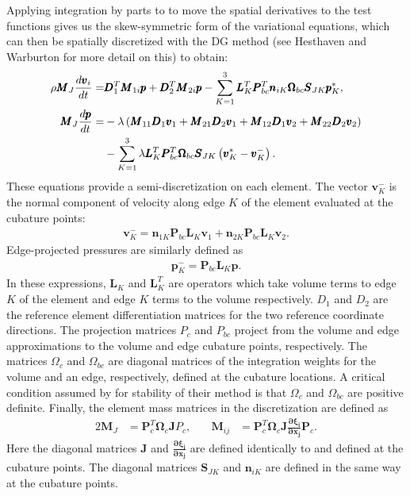 Applying integration by parts to  to move the spatial derivatives to
the test functions gives us the skew-symmetric form of the variational equations, which
can then be spatially discretized with the DG method (see Hesthaven and Warburton for more
detail on this) to obtain:
\begin{align}
  \rho \pmb{M}_{J} \frac{d \pmb{v}_{i}}{dt} =&
  \pmb{D}_{1}^{T} \pmb{M}_{1i} \pmb{p}
  + \pmb{D}_{2}^{T} \pmb{M}_{2i} \pmb{p}
  - \sum_{K=1}^{3} \pmb{L}_{K}^{T} \pmb{P}_{bc}^{T} \pmb{n}_{iK}
  \pmb{\Omega}_{bc} \pmb{S}_{JK} \pmb{p}_{K}^{*},\\
  \notag
  \pmb{M}_{J} \frac{d\pmb{p}}{dt} =&
  -\lambda\left(
  \pmb{M}_{11} \pmb{D}_{1} \pmb{v}_{1}
    +
    \pmb{M}_{21} \pmb{D}_{2} \pmb{v}_{1}
    +
    \pmb{M}_{12} \pmb{D}_{1} \pmb{v}_{2}
    +
    \pmb{M}_{22} \pmb{D}_{2} \pmb{v}_{2}
  \right)\\
  &- \sum_{K=1}^{3}\lambda \pmb{L}_{K}^{T} \pmb{P}_{bc}^{T} \pmb{\Omega}_{bc}
  \pmb{S}_{JK} \left(\pmb{v}_{K}^* - \pmb{v}_{K}^{-}\right).
\end{align}
These equations provide a semi-discretization on each element.
The vector $\pmb{v}_{K}^{-}$ is the normal component of velocity along
edge $K$ of the element evaluated at the cubature points:
\begin{align}
  \pmb{v}^{-}_{K} = \pmb{n}_{1K} \pmb{P}_{bc} \pmb{L}_{K} \pmb{v}_{1}
  + \pmb{n}_{2K} \pmb{P}_{bc} \pmb{L}_{K} \pmb{v}_{2}.
\end{align}
Edge-projected pressures are similarly defined as
\begin{align}
  \pmb{p}_{K}^{-} = \pmb{P}_{bc}\pmb{L}_{K} \pmb{p}.
\end{align}
In these expressions, $\pmb{L}_{K}$ and $\pmb{L}_{K}^{T}$ are operators
which take volume terms to edge $K$ of the element and edge $K$ terms to
the volume respectively. $D_{1}$ and $D_{2}$ are the reference
element differentiation matrices for the two reference coordinate directions.
The projection matrices $P_{c}$ and $P_{bc}$ project from the volume and edge
approximations to the volume and edge cubature points, respectively. The matrices
$\Omega_{c}$ and $\Omega_{bc}$ are diagonal matrices of the integration weights for
the volume and an edge, respectively, defined at the cubature locations. A critical
condition assumed by \cite{kozdon2016stable} for stability of their method is that
$\Omega_{c}$ and $\Omega_{bc}$ are positive definite. Finally, the
element mass matrices in the discretization are defined as
\begin{alignat}{2}
  \pmb{M}_{J}  &= \pmb{P}_{c}^{T} \pmb{\Omega}_{c} \pmb{J} P_{c},\quad&
  \pmb{M}_{ij} &= \pmb{P}_{c}^{T} \pmb{\Omega}_{c} \pmb{J}
		  \frac{\pmb{\partial \xi_{i}}}{\pmb{\partial x_{j}}} \pmb{P}_{c}.
\end{alignat}
Here the diagonal matrices $\pmb{J}$ and $\pmb{\frac{\partial \xi_{i}}{\partial x_{j}}}$
are defined identically to  and defined at the cubature points. The diagonal matrices $\pmb{S}_{JK}$ and $\pmb{n}_{iK}$ are defined in the same way at the cubature
points.

